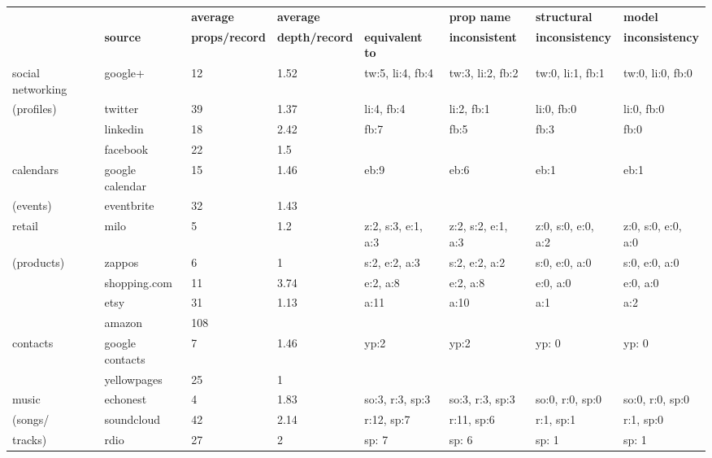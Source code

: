 \documentclass{sigchi}
\begin{document}
\begin{table}
\small
\begin{tabular}{p{2.0cm}  p{1.8cm}  p{1.8cm}  p{1.8cm}  p{1.8cm}  p{1.8cm}  p{1.8cm}  p{1.8cm}}
				&				& {\bf average}				& {\bf average }				& 				& {\bf prop name}			& {\bf structural} 			& {\bf model } \\
				& {\bf source}		& {\bf props/record}			& {\bf depth/record}			& {\bf equivalent to}	& {\bf inconsistent}			& {\bf inconsistency} 			& {\bf inconsistency} \\
\hline
social networking	& google+			& 12						& 1.52					& tw:5, li:4, fb:4		& tw:3, li:2, fb:2				& tw:0, li:1, fb:1				& tw:0, li:0, fb:0 \\
(profiles)			& twitter			& 39						& 1.37					& li:4, fb:4 			& li:2, fb:1					& li:0, fb:0					& li:0, fb:0 \\
				& linkedin			& 18						& 2.42					& fb:7			& fb:5					& fb:3					& fb:0 \\
				& facebook		& 22						& 1.5						&				&						&						& \\
\hline
calendars			& google calendar	& 15						& 1.46					& eb:9			& eb:6					& eb:1					& eb:1 \\
(events)			& eventbrite		& 32						& 1.43					&				&						& 						& \\
\hline
retail				& milo			& 5						& 1.2						& z:2, s:3, e:1, a:3	& z:2, s:2, e:1, a:3			& z:0, s:0, e:0, a:2			& z:0, s:0, e:0, a:0 \\
(products)			& zappos			& 6						& 1						& s:2, e:2, a:3		& s:2, e:2, a:2				& s:0, e:0, a:0				& s:0, e:0, a:0 \\
				& shopping.com	& 11						& 3.74					& e:2, a:8			& e:2, a:8					& e:0, a:0					& e:0, a:0 \\
				& etsy			& 31						& 1.13					& a:11			& a:10					& a:1						& a:2 \\
				& amazon			& 108					&						&				& 						&						& \\
\hline
contacts			& google contacts	& 7						& 1.46					& yp:2			& yp:2					& yp: 0					& yp: 0 \\
				& yellowpages		& 25						& 1						&				&						&						& \\
\hline
music			& echonest		& 4						& 1.83					& so:3, r:3, sp:3		& so:3, r:3, sp:3				& so:0, r:0, sp:0				& so:0, r:0, sp:0 \\
(songs/			& soundcloud		& 42						& 2.14					& r:12, sp:7		& r:11, sp:6 				& r:1, sp:1					& r:1, sp:0 \\
tracks)			& rdio			& 27						& 2						& sp: 7			& sp: 6					& sp: 1					& sp: 1 \\

\end{tabular}
\end{table}
\end{document}
